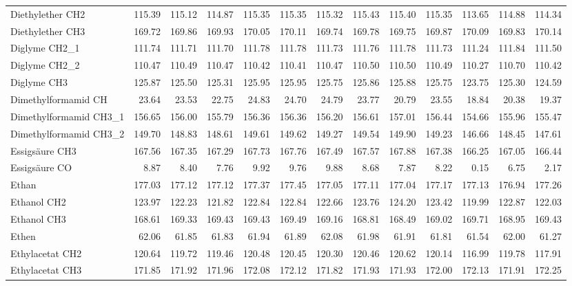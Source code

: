 \begin{table}[ht!]
{\begin{tabular}{lrrrrrrrrrrrr}
    Diethylether CH2 & 115.39 & 115.12 & 114.87 & 115.35 & 115.35 & 115.32 & 115.43 & 115.40 & 115.35 & 113.65 & 114.88 & 114.34 \\
    Diethylether CH3 & 169.72 & 169.86 & 169.93 & 170.05 & 170.11 & 169.74 & 169.78 & 169.75 & 169.87 & 170.09 & 169.83 & 170.14 \\
    Diglyme CH2\_1 & 111.74 & 111.71 & 111.70 & 111.78 & 111.78 & 111.73 & 111.76 & 111.78 & 111.73 & 111.24 & 111.84 & 111.50 \\
    Diglyme CH2\_2 & 110.47 & 110.49 & 110.47 & 110.42 & 110.41 & 110.47 & 110.50 & 110.50 & 110.49 & 110.27 & 110.70 & 110.42 \\
    Diglyme CH3 & 125.87 & 125.50 & 125.31 & 125.95 & 125.95 & 125.75 & 125.86 & 125.88 & 125.75 & 123.75 & 125.30 & 124.59 \\
    Dimethylformamid CH & 23.64 & 23.53 & 22.75 & 24.83 & 24.70 & 24.79 & 23.77 & 20.79 & 23.55 & 18.84 & 20.38 & 19.37 \\
    Dimethylformamid CH3\_1 & 156.65 & 156.00 & 155.79 & 156.36 & 156.36 & 156.20 & 156.61 & 157.01 & 156.44 & 154.66 & 155.96 & 155.47 \\
    Dimethylformamid CH3\_2 & 149.70 & 148.83 & 148.61 & 149.61 & 149.62 & 149.27 & 149.54 & 149.90 & 149.23 & 146.66 & 148.45 & 147.61 \\
    Essigsäure CH3 & 167.56 & 167.35 & 167.29 & 167.73 & 167.76 & 167.49 & 167.57 & 167.88 & 167.38 & 166.25 & 167.05 & 166.44 \\
    Essigsäure CO & 8.87  & 8.40  & 7.76  & 9.92  & 9.76  & 9.88  & 8.68  & 7.87  & 8.22  & 0.15  & 6.75  & 2.17 \\
    Ethan & 177.03 & 177.12 & 177.12 & 177.37 & 177.45 & 177.05 & 177.11 & 177.04 & 177.17 & 177.13 & 176.94 & 177.26 \\
    Ethanol CH2 & 123.97 & 122.23 & 121.82 & 122.84 & 122.84 & 122.66 & 123.76 & 124.20 & 123.42 & 119.99 & 122.87 & 122.03 \\
    Ethanol CH3 & 168.61 & 169.33 & 169.43 & 169.43 & 169.49 & 169.16 & 168.81 & 168.49 & 169.02 & 169.71 & 168.95 & 169.43 \\
    Ethen & 62.06 & 61.85 & 61.83 & 61.94 & 61.89 & 62.08 & 61.98 & 61.91 & 61.81 & 61.54 & 62.00 & 61.27 \\
    Ethylacetat CH2 & 120.64 & 119.72 & 119.46 & 120.48 & 120.45 & 120.30 & 120.46 & 120.62 & 120.14 & 116.99 & 119.78 & 117.91 \\
    Ethylacetat CH3 & 171.85 & 171.92 & 171.96 & 172.08 & 172.12 & 171.82 & 171.93 & 171.93 & 172.00 & 172.13 & 171.91 & 172.25 \\

\end{tabular}}
\end{table}
